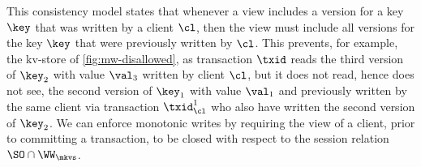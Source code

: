 This consistency model states that whenever a view includes a version for a key \( \key \) 
that was written by a client $\cl$,
then the view must include all versions for the key \( \key \) that were previously written by $\cl$. 
This prevents, for example, the kv-store of \cref{fig:mw-disallowed}, as
transaction $\txid$ reads the third version of $\key_2$ 
with value $\val_3$ written by client $\cl$, 
but it does not read, hence does not see, the second version of $\key_1$
with value $\val_1$ and previously written by the same client via transaction \( \txid^1_{\cl} \)
who also have written the second version of \( \key_2 \).
We can enforce monotonic writes by requiring the view of a client, prior to committing 
a transaction, to be closed with respect to the session relation $\SO \cap \WW_{\mkvs}$.

